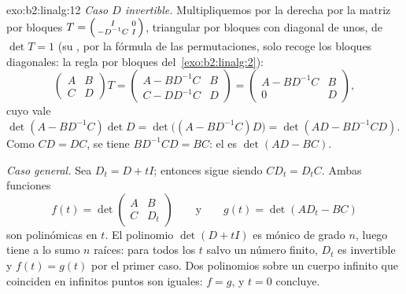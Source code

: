 \begin{solution}{exo:b2:linalg:12}
\emph{Caso $D$ invertible.} Multipliquemos por la derecha por la
matriz por bloques $T = \begin{psmallmatrix} I & 0\\ -D^{-1}C &
I\end{psmallmatrix}$, triangular por bloques con diagonal de unos, de
$\det T = 1$ (su , por la fórmula de las permutaciones,
solo recoge los bloques diagonales: la regla por bloques del~\cref{exo:b2:linalg:2}):
\[
\begin{pmatrix} A & B\\ C & D\end{pmatrix} T
= \begin{pmatrix} A - BD^{-1}C & B\\ C - DD^{-1}C & D\end{pmatrix}
= \begin{pmatrix} A - BD^{-1}C & B\\ 0 & D\end{pmatrix},
\]
cuyo  vale $\det(A - BD^{-1}C)\det D = \det\bigl((A -
BD^{-1}C)D\bigr) = \det(AD - BD^{-1}CD)$. Como $CD = DC$, se tiene
$BD^{-1}CD = BC$: el  es $\det(AD - BC)$.

\emph{Caso general.} Sea $D_t = D + tI$; entonces sigue siendo $CD_t
= D_tC$. Ambas funciones
\[
f(t) = \det\begin{pmatrix} A & B\\ C & D_t\end{pmatrix}
\qquad\text{y}\qquad
g(t) = \det(AD_t - BC)
\]
son polinómicas en $t$. El polinomio $\det(D + tI)$ es mónico de
grado $n$, luego tiene a lo sumo $n$ raíces: para todos los $t$ salvo
un número finito, $D_t$ es invertible y $f(t) = g(t)$ por el primer
caso. Dos polinomios sobre un cuerpo infinito que coinciden en
infinitos puntos son iguales: $f = g$, y $t = 0$ concluye.
\end{solution}

